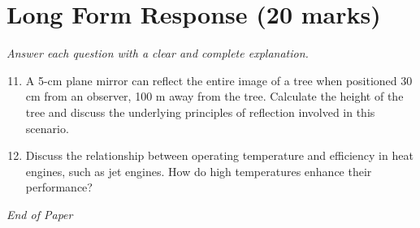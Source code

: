 \documentclass[12pt]{article}
\begin{document}
\section*{Long Form Response (20 marks)}
\textit{Answer each question with a clear and complete explanation.}
\begin{enumerate}[label=\arabic*.]
\setcounter{enumi}{10}
\item A 5-cm plane mirror can reflect the entire image of a tree when positioned 30 cm from an observer, 100 m away from the tree. Calculate the height of the tree and discuss the underlying principles of reflection involved in this scenario.
\item Discuss the relationship between operating temperature and efficiency in heat engines, such as jet engines. How do high temperatures enhance their performance?
\end{enumerate}

\vfill
\noindent\textit{End of Paper}
\end{document}
